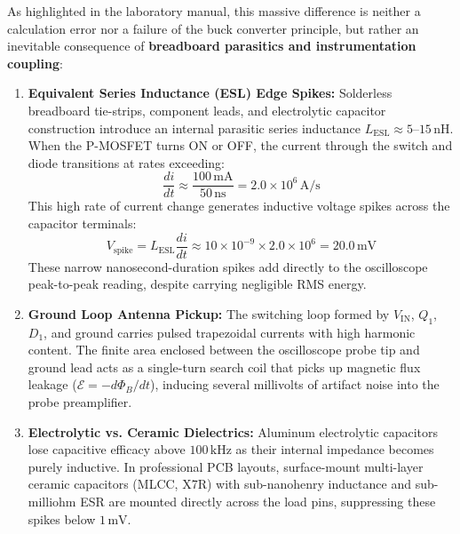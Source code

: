 \documentclass[12pt,a4paper]{article}
\newcommand{\Vin}{V_{\mathrm{IN}}}
\begin{document}
As highlighted in the laboratory manual, this massive difference is neither a calculation error nor a failure of the buck converter principle, but rather an inevitable consequence of \textbf{breadboard parasitics and instrumentation coupling}:
\begin{enumerate}[leftmargin=1.5em]
    \item \textbf{Equivalent Series Inductance (ESL) Edge Spikes:} Solderless breadboard tie-strips, component leads, and electrolytic capacitor construction introduce an internal parasitic series inductance $L_{\mathrm{ESL}} \approx 5\text{--}15\,\mathrm{nH}$. When the P-MOSFET turns ON or OFF, the current through the switch and diode transitions at rates exceeding:
    \begin{equation}
        \frac{di}{dt} \approx \frac{100\,\mathrm{mA}}{50\,\mathrm{ns}} = 2.0\times 10^6\,\mathrm{A/s}
    \end{equation}
    This high rate of current change generates inductive voltage spikes across the capacitor terminals:
    \begin{equation}
        V_{\mathrm{spike}} = L_{\mathrm{ESL}} \frac{di}{dt} \approx 10\times 10^{-9} \times 2.0\times 10^6 = \mathbf{20.0\,\mathrm{mV}}
    \end{equation}
    These narrow nanosecond-duration spikes add directly to the oscilloscope peak-to-peak reading, despite carrying negligible RMS energy.
    \item \textbf{Ground Loop Antenna Pickup:} The switching loop formed by $\Vin$, $Q_1$, $D_1$, and ground carries pulsed trapezoidal currents with high harmonic content. The finite area enclosed between the oscilloscope probe tip and ground lead acts as a single-turn search coil that picks up magnetic flux leakage ($\mathcal{E} = -d\Phi_B/dt$), inducing several millivolts of artifact noise into the probe preamplifier.
    \item \textbf{Electrolytic vs. Ceramic Dielectrics:} Aluminum electrolytic capacitors lose capacitive efficacy above $100\,\mathrm{kHz}$ as their internal impedance becomes purely inductive. In professional PCB layouts, surface-mount multi-layer ceramic capacitors (MLCC, X7R) with sub-nanohenry inductance and sub-milliohm ESR are mounted directly across the load pins, suppressing these spikes below $1\,\mathrm{mV}$.
\end{enumerate}

\end{document}
